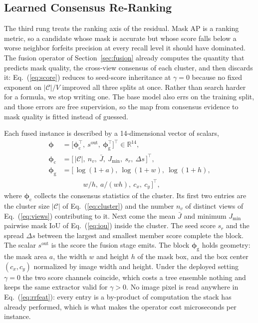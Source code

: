 \subsection{Learned Consensus Re-Ranking}\label{sec:rerank}

The third rung treats the ranking axis of the residual. Mask AP is a ranking metric, so a candidate whose mask is accurate but whose score falls below a worse neighbor forfeits precision at every recall level it should have dominated. The fusion operator of Section~\ref{sec:fusion} already computes the quantity that predicts mask quality, the cross-view consensus of each cluster, and then discards it: Eq.~(\ref{eq:score}) reduces to seed-score inheritance at $\gamma=0$ because no fixed exponent on $|\mathcal{C}|/V$ improved all three splits at once. Rather than search harder for a formula, we stop writing one. The base model also errs on the training split, and those errors are free supervision, so the map from consensus evidence to mask quality is fitted instead of guessed.

Each fused instance is described by a 14-dimensional vector of scalars,
\begin{equation}\label{eq:rrfeat}
\begin{split}
\boldsymbol{\phi}&=\bigl[\boldsymbol{\phi}_{\mathrm{c}}^{\top},\ s^{\mathrm{out}},\ \boldsymbol{\phi}_{\mathrm{g}}^{\top}\bigr]^{\top}\in\mathbb{R}^{14},\\
\boldsymbol{\phi}_{\mathrm{c}}&=\bigl[\,|\mathcal{C}|,\ n_v,\ \bar{J},\ J_{\min},\ s_r,\ \Delta s\,\bigr]^{\top},\\
\boldsymbol{\phi}_{\mathrm{g}}&=\bigl[\,\log(1{+}a),\ \log(1{+}w),\ \log(1{+}h),\\
&\qquad\quad w/h,\ a/(wh),\ c_x,\ c_y\,\bigr]^{\top},
\end{split}
\end{equation}
where $\boldsymbol{\phi}_{\mathrm{c}}$ collects the consensus statistics of the cluster. Its first two entries are the cluster size $|\mathcal{C}|$ of Eq.~(\ref{eq:cluster}) and the number $n_v$ of distinct views of Eq.~(\ref{eq:views}) contributing to it. Next come the mean $\bar{J}$ and minimum $J_{\min}$ pairwise mask IoU of Eq.~(\ref{eq:iou}) inside the cluster. The seed score $s_r$ and the spread $\Delta s$ between the largest and smallest member score complete the block. The scalar $s^{\mathrm{out}}$ is the score the fusion stage emits. The block $\boldsymbol{\phi}_{\mathrm{g}}$ holds geometry: the mask area $a$, the width $w$ and height $h$ of the mask box, and the box center $(c_x,c_y)$ normalized by image width and height. Under the deployed setting $\gamma=0$ the two score channels coincide, which costs a tree ensemble nothing and keeps the same extractor valid for $\gamma>0$. No image pixel is read anywhere in Eq.~(\ref{eq:rrfeat}): every entry is a by-product of computation the stack has already performed, which is what makes the operator cost microseconds per instance.

